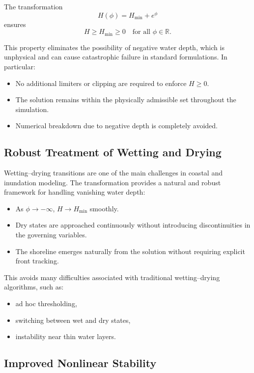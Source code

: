 \documentclass[11pt]{article}
\begin{document}
The transformation
\[
H(\phi) = H_{\min} + e^{\phi}
\]
ensures
\[
H \ge H_{\min} \ge 0
\quad \text{for all } \phi \in \mathbb{R}.
\]

This property eliminates the possibility of negative water depth, which is unphysical and can cause catastrophic failure in standard formulations. In particular:
\begin{itemize}[leftmargin=2em]
    \item No additional limiters or clipping are required to enforce $H \ge 0$.
    \item The solution remains within the physically admissible set throughout the simulation.
    \item Numerical breakdown due to negative depth is completely avoided.
\end{itemize}

\subsection{Robust Treatment of Wetting and Drying}

Wetting--drying transitions are one of the main challenges in coastal and inundation modeling. The transformation provides a natural and robust framework for handling vanishing water depth:
\begin{itemize}[leftmargin=2em]
    \item As $\phi \to -\infty$, $H \to H_{\min}$ smoothly.
    \item Dry states are approached continuously without introducing discontinuities in the governing variables.
    \item The shoreline emerges naturally from the solution without requiring explicit front tracking.
\end{itemize}

This avoids many difficulties associated with traditional wetting--drying algorithms, such as:
\begin{itemize}[leftmargin=2em]
    \item ad hoc thresholding,
    \item switching between wet and dry states,
    \item instability near thin water layers.
\end{itemize}

\subsection{Improved Nonlinear Stability}
\end{document}
